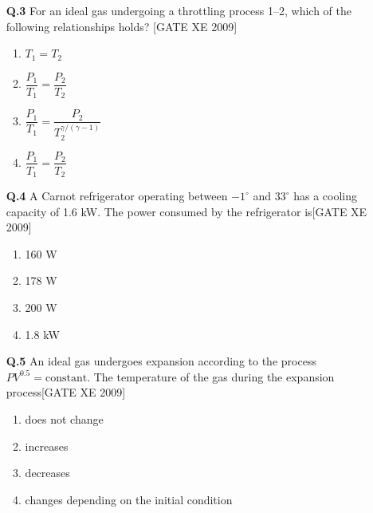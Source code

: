 \documentclass[journal,12pt,onecolumn]{IEEEtran}
\theoremstyle{remark}
\begin{document}
\begin{enumerate}
\vspace{0.3cm}

\item[\textbf{Q.3}] For an ideal gas undergoing a throttling process 1--2, which of the following relationships holds?
\hfill[GATE XE 2009]
\begin{multicols}{2}
\begin{enumerate}
    \item $T_1 = T_2$
    \item $\dfrac{P_1}{T_1} = \dfrac{P_2}{T_2}$
    \item $\dfrac{P_1}{T_1} = \dfrac{P_2}{T_2^{\gamma/(\gamma - 1)}}$
    \item $\dfrac{P_1}{T_1} = \dfrac{P_2}{T_2}$
\end{enumerate}
\end{multicols}

\vspace{0.3cm}

\item[\textbf{Q.4}]  A Carnot refrigerator operating between $-1^\circ$  and $33^\circ$  has a cooling capacity of 1.6 kW. The power consumed by the refrigerator is\hfill[GATE XE 2009]
\begin{multicols}{2}
\begin{enumerate}
    \item 160 W
    \item 178 W
    \item 200 W
    \item 1.8 kW
\end{enumerate}
\end{multicols}

\vspace{0.3cm}

\item[\textbf{Q.5}] An ideal gas undergoes expansion according to the process $PV^{0.5} = \text{constant}$. The temperature of the gas during the expansion process\hfill[GATE XE 2009]
\begin{multicols}{2}
\begin{enumerate}
    \item does not change
    \item increases
    \item decreases
    \item changes depending on the initial condition
\end{enumerate}
\end{multicols}


\end{enumerate}
\end{document}
